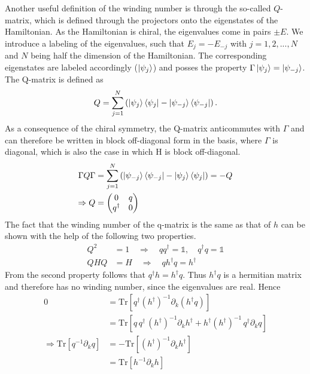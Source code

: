 Another useful definition of the winding number is through the so-called $Q$-matrix, which is defined through the projectors onto the eigenstates of the Hamiltonian. As the Hamiltonian is chiral, the eigenvalues come in pairs $\pm E$. We introduce a labeling of the eigenvalues, such that $E_j = -E_{-j}$ with $j=1,2,...,N$ and $N$ being half the dimension of the Hamiltonian. The corresponding eigenstates are labeled accordingly ($\ket{\psi_j}$) and posses the property $\Gamma\ket{\psi_j}=\ket{\psi_{-j}}$. The Q-matrix is defined as 
\begin{align*}
    Q = \sum_{j=1}^N \left(\ket{\psi_j}\bra{\psi_j} - \ket{\psi_{-j}}\bra{\psi_{-j}}\right).
\end{align*}
As a consequence of the chiral symmetry, the Q-matrix anticommutes with $\Gamma$ and can therefore be written in block off-diagonal form in the basis, where $\Gamma$ is diagonal, which is also the case in which H is block off-diagonal.
\begin{align*}
    \Gamma Q \Gamma &= \sum_{j=1}^N \left( \ket{\psi_{-j}}\bra{\psi_{-j}} - \ket{\psi_j}\bra{\psi_j}\right) = -Q\\
    \Rightarrow Q &= \begin{pmatrix}
        0 & q \\
        q^\dagger & 0
    \end{pmatrix}
\end{align*}
The fact that the winding number of the q-matrix is the same as that of $h$ can be shown with the help of the following two properties.
\begin{align*}
    Q^2 &= 1\quad\Rightarrow \quad q q^\dagger = \mathbb{1}, \quad q^\dagger q = \mathbb{1}\\
    QHQ& = H\quad\Rightarrow\quad qh^\dagger q=h^\dagger
\end{align*}
From the second property follows that $q^\dagger h = h^\dagger q$. Thus $h^\dagger q$ is a hermitian matrix and therefore has no winding number, since the eigenvalues are real. Hence
\begin{align*}
    0 &= \text{Tr}\left[ q^\dagger (h^\dagger)^{-1} \partial_k (h^\dagger q)\right]\\
    &= \text{Tr}\left[q\,q^\dagger\,(h^\dagger)^{-1} \partial_k h^\dagger + h^\dagger (h^\dagger)^{-1}\,q^\dagger \partial_k q\right]\\
    \Rightarrow \text{Tr}\left[q^{-1} \partial_k q\right] &= -\text{Tr}\left[(h^\dagger)^{-1} \partial_k h^\dagger\right]\\
    &=\text{Tr}\left[h^{-1} \partial_k h\right]
\end{align*}

